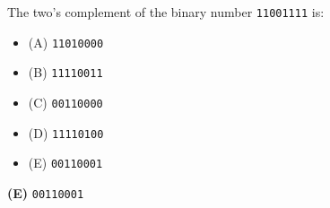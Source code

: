 

The two's complement of the binary number {\tt 11001111} is:

\begin{itemize}
\item{(A)} {\tt 11010000}
\vskip 5pt 
\item{(B)} {\tt 11110011}
\vskip 5pt 
\item{(C)} {\tt 00110000}
\vskip 5pt 
\item{(D)} {\tt 11110100}
\vskip 5pt 
\item{(E)} {\tt 00110001}
\end{itemize}







{\bf (E)} {\tt 00110001}
 










